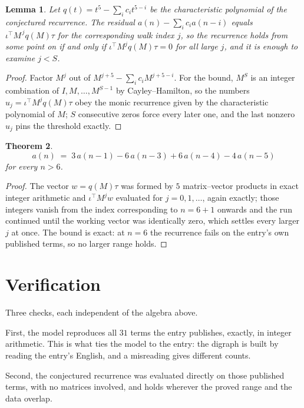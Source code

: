 \documentclass[11pt,a4paper]{article}
\theoremstyle{plain}
\newtheorem{theorem}{Theorem}
\newtheorem{lemma}[theorem]{Lemma}
\theoremstyle{definition}
\begin{document}
\begin{lemma}\label{lem:crit}
Let $q(t)=t^{5}-\sum_i c_it^{5-i}$ be the characteristic polynomial of the
conjectured recurrence. The residual $a(n)-\sum_ic_ia(n-i)$ equals
$\iota^{\!\top}M^{\,j}q(M)\tau$ for the corresponding walk index $j$, so the recurrence
holds from some point on if and only if $\iota^{\!\top}M^{j}q(M)\tau=0$ for all large $j$,
and it is enough to examine $j<S$.
\end{lemma}

\begin{proof}
Factor $M^{j}$ out of $M^{j+5}-\sum_ic_iM^{j+5-i}$. For the bound, $M^{S}$
is an integer combination of $I,M,\dots,M^{S-1}$ by Cayley--Hamilton, so the numbers
$u_j=\iota^{\!\top}M^{j}q(M)\tau$ obey the monic recurrence given by the characteristic
polynomial of $M$; $S$ consecutive zeros force every later one, and the last nonzero $u_j$
pins the threshold exactly.
\end{proof}

\begin{theorem}
\[
a(n)\;=\;3\,a(n-1) - 6\,a(n-3) + 6\,a(n-4) - 4\,a(n-5)
\]
for every $n>6$.
\end{theorem}

\begin{proof}
The vector $w=q(M)\tau$ was formed by $5$ matrix--vector products in exact integer
arithmetic and $\iota^{\!\top}M^{j}w$ evaluated for $j=0,1,\dots$, again exactly; those
integers vanish from the index corresponding to $n=6+1$ onwards and the run continued
until the working vector was identically zero, which settles every larger $j$ at once. The bound is exact: at $n=6$ the recurrence fails on the entry's own published terms, so no larger range holds.
\end{proof}

\section{Verification}

Three checks, each independent of the algebra above.

First, the model reproduces all $31$ terms the entry publishes, exactly, in integer
arithmetic. This is what ties the model to the entry: the digraph is built by reading the
entry's English, and a misreading gives different counts.

Second, the conjectured recurrence was evaluated directly on those published terms, with no
matrices involved, and holds wherever the proved range and the data overlap.
\end{document}
